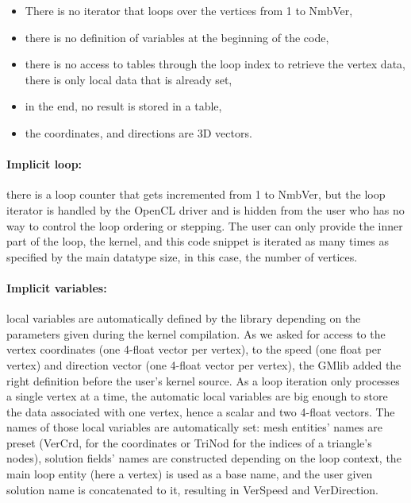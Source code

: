 \documentclass[a4paper,12pt]{article}
\begin{document}
\begin{itemize}
\item There is no iterator that loops over the vertices from 1 to NmbVer,
\item there is no definition of variables at the beginning of the code,
\item there is no access to tables through the loop index to retrieve the vertex data, there is only local data that is already set,
\item in the end, no result is stored in a table,
\item the coordinates, and directions are 3D vectors.
\end{itemize}

\paragraph{Implicit loop:} there is a loop counter that gets incremented from 1 to NmbVer, but the loop iterator is handled by the OpenCL driver and is hidden from the user who has no way to control the loop ordering or stepping. The user can only provide the inner part of the loop, the kernel, and this code snippet is iterated as many times as specified by the main datatype size, in this case, the number of vertices.

\paragraph{Implicit variables:} local variables are automatically defined by the library depending on the parameters given during the kernel compilation. As we asked for access to the vertex coordinates (one 4-float vector per vertex), to the speed (one float per vertex) and direction vector (one 4-float vector per vertex), the GMlib added the right definition before the user's kernel source. As a loop iteration only processes a single vertex at a time, the automatic local variables are big enough to store the data associated with one vertex, hence a scalar and two 4-float vectors. The names of those local variables are automatically set: mesh entities' names are preset (VerCrd, for the coordinates or TriNod for the indices of a triangle's nodes), solution fields' names are constructed depending on the loop context, the main loop entity (here a vertex) is used as a base name, and the user given solution name is concatenated to it, resulting in VerSpeed and VerDirection. 
\end{document}
